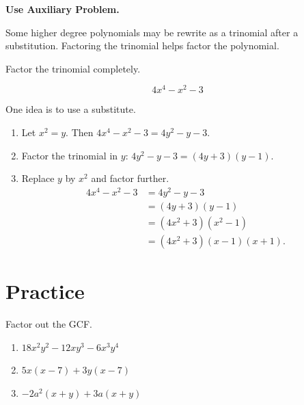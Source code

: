 \documentclass[
  en,11pt]{elegantbook}
\newcommand{\size}[2]{{\fontsize{#1}{0}\selectfont#2}}
\newenvironment{rmdtip}{
	\vspace*{0.5\baselineskip}
	\par\noindent
	\makebox[-3pt][r]{\color{red!90}\size{12}{\HandRight}\,\,}
    \begin{tcolorbox}[
    enhanced,
    title={\textbf{\color{second}Tips}},
    title style={left color=blue!10!green!20!white,right color=yellow!20!blue!20!white},
    colback=cyan!10!white,
    ]
    \sffamily
}{
    \end{tcolorbox}
    \par\ignorespacesafterend
}
\let\BeginKnitrBlock\begin \let\EndKnitrBlock\end
\begin{document}
\begin{rmdtip}

\textbf{Use Auxiliary Problem.}

Some higher degree polynomials may be rewrite as a trinomial after a substitution. Factoring the trinomial helps factor the polynomial.

\end{rmdtip}

\BeginKnitrBlock{example}
\protect\hypertarget{exm:unnamed-chunk-23}{}{\label{exm:unnamed-chunk-23} }
Factor the trinomial completely.

\[4x^4-x^2-3\]
\EndKnitrBlock{example}

\BeginKnitrBlock{solution}
{}
One idea is to use a substitute.

\begin{enumerate}
\def\labelenumi{\arabic{enumi}.}

\item
  Let \(x^2=y\). Then \(4x^4-x^2-3=4y^2-y-3\).
\item
  Factor the trinomial in \(y\): \(4y^2-y-3=(4y+3)(y-1)\).
\item
  Replace \(y\) by \(x^2\) and factor further.
  \[
   \begin{split}
       4x^4-x^2-3&=4y^2-y-3\\
       &=(4y+3)(y-1)\\
       &=(4x^2+3)(x^2-1)\\
       &=(4x^2+3)(x-1)(x+1).
   \end{split}
  \]
\end{enumerate}
\EndKnitrBlock{solution}

\newpage

\hypertarget{practice-1}{%
\section{Practice}\label{practice-1}}

\BeginKnitrBlock{exercise}
\protect\hypertarget{exr:unnamed-chunk-25}{}{\label{exr:unnamed-chunk-25} }
Factor out the GCF.

\begin{enumerate}
\def\labelenumi{\arabic{enumi}.}

\item
  \(18x^2y^2-12xy^3-6x^3y^4\)
\item
  \(5x(x-7)+3y(x-7)\)
\item
  \(-2a^2(x+y)+3a(x+y)\)
\end{enumerate}
\EndKnitrBlock{exercise}
\end{document}
